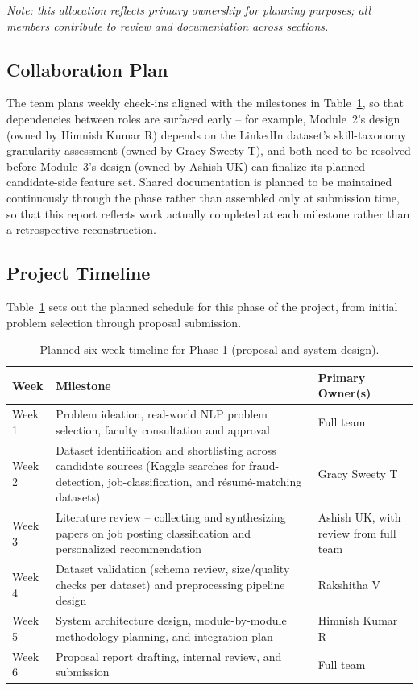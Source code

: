 \documentclass[11pt,a4paper]{article}
\begin{document}
\textit{Note: this allocation reflects primary ownership for planning purposes; all
members contribute to review and documentation across sections.}

\subsection{Collaboration Plan}

The team plans weekly check-ins aligned with the milestones in
Table~\ref{tab:timeline}, so that dependencies between roles are surfaced early -- for
example, Module~2's design (owned by Himnish Kumar R) depends on the LinkedIn dataset's
skill-taxonomy granularity assessment (owned by Gracy Sweety T), and both need to be
resolved before Module~3's design (owned by Ashish UK) can finalize its planned
candidate-side feature set. Shared documentation is planned to be maintained
continuously through the phase rather than assembled only at submission time, so that
this report reflects work actually completed at each milestone rather than a
retrospective reconstruction.

\subsection{Project Timeline}

Table~\ref{tab:timeline} sets out the planned schedule for this phase of the project,
from initial problem selection through proposal submission.

\begin{table}[h]
\centering
\begin{tabular}{@{}p{2.2cm}p{5.2cm}p{5.4cm}@{}}
\toprule
\textbf{Week} & \textbf{Milestone} & \textbf{Primary Owner(s)} \\
\midrule
Week 1 & Problem ideation, real-world NLP problem selection, faculty consultation and
approval & Full team \\
Week 2 & Dataset identification and shortlisting across candidate sources (Kaggle
searches for fraud-detection, job-classification, and r\'esum\'e-matching datasets) &
Gracy Sweety T \\
Week 3 & Literature review -- collecting and synthesizing papers on job posting
classification and personalized recommendation & Ashish UK, with review from full team \\
Week 4 & Dataset validation (schema review, size/quality checks per dataset) and
preprocessing pipeline design & Rakshitha V \\
Week 5 & System architecture design, module-by-module methodology planning, and
integration plan & Himnish Kumar R \\
Week 6 & Proposal report drafting, internal review, and submission & Full team \\
\bottomrule
\end{tabular}
\caption{Planned six-week timeline for Phase 1 (proposal and system design).}
\label{tab:timeline}
\end{table}
\end{document}
